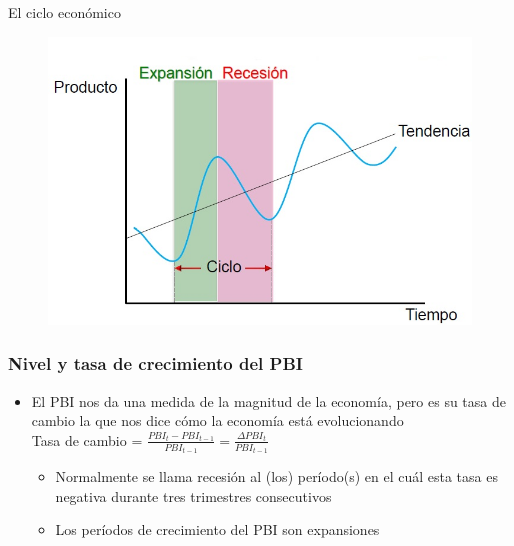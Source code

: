 \documentclass{beamer}
\begin{document}
\begin{frame}{ El ciclo económico}
    \begin{figure} [H]   
\includegraphics[scale=0.55]{Figures/C19.1.jpg}
\label{fig:19.1}
\end{figure}
\end{frame}

\begin{frame}
\frametitle{Nivel y tasa de crecimiento del PBI }
\begin{itemize}
    \item El PBI nos da una medida de la magnitud de la economía, pero es su tasa de cambio la que nos dice cómo la economía está evolucionando \\ \vspace{2mm}
    Tasa de cambio = $\frac{PBI_t-PBI_{t-1}}{PBI_{t-1}}=\frac{\Delta PBI_{t}}{PBI_{t-1}} $
    \vspace{2mm}
    \begin{itemize}
        \item Normalmente se llama recesión al (los) período(s) en el cuál esta tasa es negativa durante tres trimestres consecutivos
        \item Los períodos de crecimiento del PBI son expansiones
    \end{itemize}
\end{itemize}
\end{frame}
\end{document}
